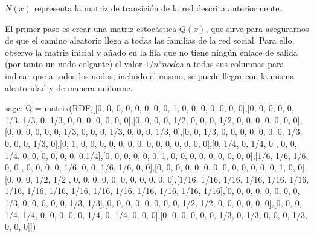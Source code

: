 \par $N(x)$ representa la matriz de transición de la red descrita anteriormente.

\par El primer paso es crear una matriz estocástica $Q(x)$, que sirve para asegurarnos de que el camino
aleatorio llega a todas las familias de la red social. Para ello, observo la matriz inicial y añado en la fila
que no tiene ningún enlace de salida (por tanto un nodo colgante) el valor $1/n^o nodos$ a todas sus columnas para indicar que 
a todos los nodos, incluido el mismo, se puede llegar con la misma aleatoridad y de manera uniforme. 

\newpage

\begin{sagecommandline}
    sage: Q = matrix(RDF,[[0, 0, 0, 0, 0, 0, 0, 0, 1, 0, 0, 0, 0, 0, 0, 0],[0, 0, 0, 0, 0, 1/3, 1/3, 0, 1/3, 0, 0, 0, 0, 0, 0, 0],[0, 0, 0, 0, 1/2, 0, 0, 0, 1/2, 0, 0, 0, 0, 0, 0, 0],[0, 0, 0, 0, 0, 0, 1/3, 0, 0, 0, 1/3, 0, 0, 0, 1/3, 0],[0, 0, 1/3, 0, 0, 0, 0, 0, 0, 0, 1/3, 0, 0, 0, 1/3, 0],[0, 1, 0, 0, 0, 0, 0, 0, 0, 0, 0, 0, 0, 0, 0, 0],[0, 1/4, 0, 1/4, 0 , 0, 0, 1/4, 0, 0, 0, 0, 0, 0, 0,1/4],[0, 0, 0, 0, 0, 0, 1, 0, 0, 0, 0, 0, 0, 0, 0, 0],[1/6, 1/6, 1/6, 0, 0 , 0, 0, 0, 0, 1/6, 0, 0, 1/6, 1/6, 0, 0],[0, 0, 0, 0, 0, 0, 0, 0, 0, 0, 0, 0, 0, 1, 0, 0],[0, 0, 0, 1/2, 1/2 , 0, 0, 0, 0, 0, 0, 0, 0, 0, 0, 0],[1/16, 1/16, 1/16, 1/16, 1/16, 1/16, 1/16, 1/16, 1/16, 1/16, 1/16, 1/16, 1/16, 1/16, 1/16, 1/16],[0, 0, 0, 0, 0, 0, 0, 0, 1/3, 0, 0, 0, 0, 0, 1/3, 1/3],[0, 0, 0, 0, 0, 0, 0, 0, 1/2, 1/2, 0, 0, 0, 0, 0, 0],[0, 0, 0, 1/4, 1/4, 0, 0, 0, 0, 0, 1/4, 0, 1/4, 0, 0, 0],[0, 0, 0, 0, 0, 0, 1/3, 0, 1/3, 0, 0, 0, 1/3, 0, 0, 0]])
\end{sagecommandline}

